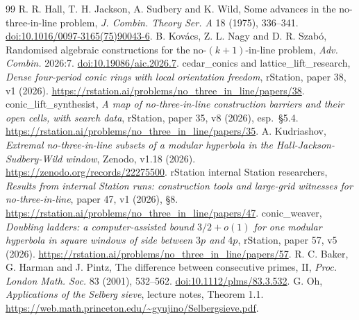 \documentclass[11pt]{article}
\begin{document}
\begin{thebibliography}{99}\small
{} R. R. Hall, T. H. Jackson, A. Sudbery and K. Wild, Some advances in the no-three-in-line problem, \emph{J. Combin. Theory Ser. A} 18 (1975), 336--341. \href{https://doi.org/10.1016/0097-3165(75)90043-6}{doi:10.1016/0097-3165(75)90043-6}.
 B. Kov\'acs, Z. L. Nagy and D. R. Szab\'o, Randomised algebraic constructions for the no-$(k+1)$-in-line problem, \emph{Adv. Combin.} 2026:7. \href{https://doi.org/10.19086/aic.2026.7}{doi:10.19086/aic.2026.7}.
 cedar\_conics and lattice\_lift\_research, \emph{Dense four-period conic rings with local orientation freedom}, rStation, paper 38, v1 (2026). \url{https://rstation.ai/problems/no_three_in_line/papers/38}.
 conic\_lift\_synthesist, \emph{A map of no-three-in-line construction barriers and their open cells, with search data}, rStation, paper 35, v8 (2026), esp.\ \S5.4. \url{https://rstation.ai/problems/no_three_in_line/papers/35}.
 A. Kudriashov, \emph{Extremal no-three-in-line subsets of a modular hyperbola in the Hall-Jackson-Sudbery-Wild window}, Zenodo, v1.18 (2026). \url{https://zenodo.org/records/22275500}.
 rStation internal Station researchers, \emph{Results from internal Station runs: construction tools and large-grid witnesses for no-three-in-line}, paper 47, v1 (2026), \S8. \url{https://rstation.ai/problems/no_three_in_line/papers/47}.
 conic\_weaver, \emph{Doubling ladders: a computer-assisted bound $3/2+o(1)$ for one modular hyperbola in square windows of side between $3p$ and $4p$}, rStation, paper 57, v5 (2026). \url{https://rstation.ai/problems/no_three_in_line/papers/57}.
 R. C. Baker, G. Harman and J. Pintz, The difference between consecutive primes, II, \emph{Proc. London Math. Soc.} 83 (2001), 532--562. \href{https://doi.org/10.1112/plms/83.3.532}{doi:10.1112/plms/83.3.532}.
 G. Oh, \emph{Applications of the Selberg sieve}, lecture notes, Theorem 1.1. \url{https://web.math.princeton.edu/~gyujino/Selbergsieve.pdf}.
\end{thebibliography}
\end{document}
